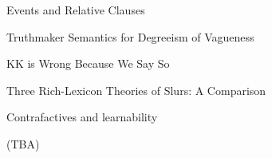 \documentclass[12pt]{jarticle}
\begin{document}
      {Events and Relative Clauses}
      {}
  
      {Truthmaker Semantics for Degreeism of Vagueness}
      {}




  
      {KK is Wrong Because We Say So}
      {}
  
      {Three Rich-Lexicon Theories of Slurs: A Comparison}
      {}
  
      {Contrafactives and learnability}
      {}




  
      {(TBA)}
      {}






  
\end{document}
